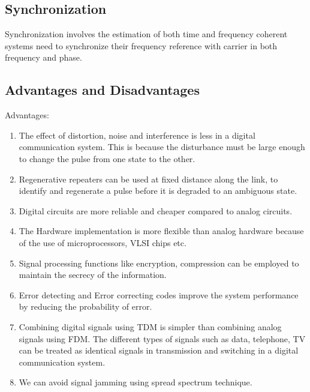 \subsection{Synchronization}

Synchronization involves the estimation of both time and frequency coherent
systems need to synchronize their frequency reference with carrier in both
frequency and phase.

\subsection{Advantages and Disadvantages}

Advantages:

\begin{enumerate}

  \item The effect of distortion, noise and interference is less in a digital
  communication system. This is because the disturbance must be large enough to
  change the pulse from one state to the other.

  \item Regenerative repeaters can be used at fixed distance along the link, to
  identify and regenerate a pulse before it is degraded to an ambiguous state.

  \item Digital circuits are more reliable and cheaper compared to analog
  circuits.

  \item The Hardware implementation is more flexible than analog hardware because
  of the use of microprocessors, VLSI chips etc.

  \item Signal processing functions like encryption, compression can be employed
  to maintain the secrecy of the information.

  \item Error detecting and Error correcting codes improve the system performance
  by reducing the probability of error.

  \item Combining digital signals using TDM is simpler than combining analog
  signals using FDM. The different types of signals such as data, telephone, TV
  can be treated as identical signals in transmission and switching in a digital
  communication system.

  \item We can avoid signal jamming using spread spectrum technique.

\end{enumerate}

